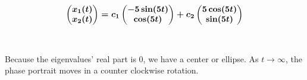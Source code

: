 \documentclass[12pt]{article}
\begin{document}
\\ 
$$
\boldmath
\begin{pmatrix}
x_1(t) \\
x_2(t)
\end{pmatrix} = 
c_1
\begin{pmatrix}
-5\sin(5t) \\
\cos(5t)
\end{pmatrix} + 
c_2
\begin{pmatrix}
5\cos(5t) \\
\sin(5t)
\end{pmatrix}
$$
\\ \\
Because the eigenvalues' real part is 0, we have a center or ellipse.  As $t \rightarrow \infty$, the phase portrait moves in a counter clockwise rotation. 

\newpage
\end{document}
